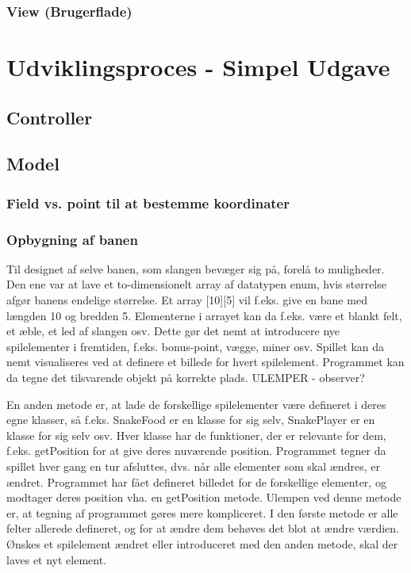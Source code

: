 \subsubsection{View (Brugerflade)}
	
\section{Udviklingsproces - Simpel Udgave}
\subsection{Controller}
	
\subsection{Model}

\subsubsection{Field vs. point til at bestemme koordinater}

\subsubsection{Opbygning af banen}

Til designet af selve banen, som slangen bevæger sig på, forelå to muligheder. Den ene var at lave et to-dimensionelt array af datatypen enum, hvis størrelse afgør banens endelige størrelse. Et array [10][5] vil f.eks. give en bane med længden 10 og bredden 5. Elementerne i arrayet kan da f.eks. være et blankt felt, et æble, et led af slangen osv. Dette gør det nemt at introducere nye spilelementer i fremtiden, f.eks. bonus-point, vægge, miner osv. Spillet kan da nemt visualiseres ved at definere et billede for hvert spilelement. Programmet kan da tegne det tilsvarende objekt på korrekte plads.
ULEMPER - observer?

En anden metode er, at lade de forskellige spilelementer være defineret i deres egne klasser, så f.eks. SnakeFood er en klasse for sig selv, SnakePlayer er en klasse for sig selv osv. Hver klasse har de funktioner, der er relevante for dem, f.eks. getPosition for at give deres nuværende position. Programmet tegner da spillet hver gang en tur afsluttes, dvs. når alle elementer som skal ændres, er ændret. Programmet har fået defineret billedet for de forskellige elementer, og modtager deres position vha. en getPosition metode.
 Ulempen ved denne metode er, at tegning af programmet gøres mere kompliceret. I den første metode er alle felter allerede defineret, og for at ændre dem behøves det blot at ændre værdien. Ønskes et spilelement ændret eller introduceret med den anden metode, skal der laves et nyt element.
 
